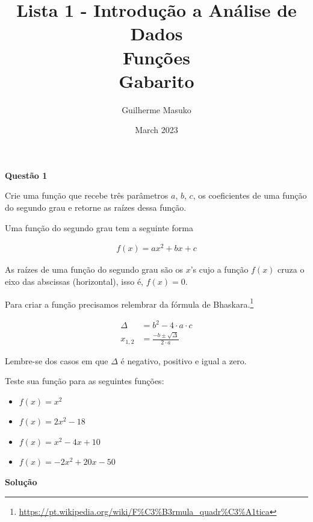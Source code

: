 \documentclass[12pt, a4paper]{article}
\title{Lista 1 - Introdução a Análise de Dados \\
Funções \\
Gabarito}
\author{Guilherme Masuko}
\date{March 2023}
\begin{document}
\clearpage
\maketitle
\thispagestyle{empty}

\textbf{Questão 1}

Crie uma função que recebe três parâmetros $a$, $b$, $c$, os coeficientes de uma função do segundo grau e retorne as raízes dessa função.

Uma função do segundo grau tem a seguinte forma 

\begin{align*}
	f(x) = ax^2 + bx + c
\end{align*}

As raízes de uma função do segundo grau são os $x$'s cujo a função $f(x)$ cruza o eixo das abscissas (horizontal), isso é, $f(x) = 0$.

Para criar a função precisamos relembrar da fórmula de Bhaskara.\footnote{\url{https://pt.wikipedia.org/wiki/F\%C3\%B3rmula_quadr\%C3\%A1tica}}

\begin{align*}
	\Delta &= b^2 -4\cdot a\cdot c \\
	x_{1,2} &= \frac{-b \pm \sqrt{\Delta}}{2\cdot a}
\end{align*}

Lembre-se dos casos em que $\Delta$ é negativo, positivo e igual a zero.

Teste sua função para as seguintes funções:

\begin{itemize}
	\item $f(x) = x^2$
	\item $f(x) = 2x^2 - 18$
	\item $f(x) = x^2 - 4x + 10$
	\item $f(x) = -2x^2 + 20x - 50$
\end{itemize}



\textbf{Solução}
\end{document}
